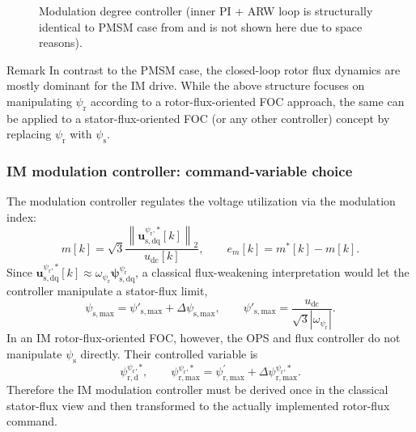 \begin{frame}
\begin{figure}
\begin{circuitikz}[>=Latex, scale=0.75, transform shape]
        \end{circuitikz}%
        \caption{Modulation degree controller  (inner PI + ARW loop is structurally identical to PMSM case from  and is not shown here due to space reasons).}
        \label{fig:modulation_degree_control_IM}
    \end{figure}\pause%
    \vspace{-0.65cm}
    \begin{varblock}{Remark}
        In contrast to the PMSM case, the closed-loop rotor flux dynamics are mostly dominant for the IM drive. While the above structure focuses on manipulating $\psi_\mathrm{r}$ according to a rotor-flux-oriented FOC approach, the same can be applied to a stator-flux-oriented FOC (or any other controller) concept by replacing $\psi_\mathrm{r}$ with $\psi_\mathrm{s}$.
    \end{varblock}
\end{frame}

\begin{frame}
    \frametitle{IM modulation controller: command-variable choice}
    The modulation controller regulates the voltage utilization via the modulation index:
    \begin{equation}
        m[k]=\sqrt{3}\frac{\left\|\bm{u}^{\psi_{\mathrm r},*}_{\mathrm{s,dq}}[k]\right\|_2}{u_{\mathrm{dc}}[k]},
        \qquad e_m[k]=m^*[k]-m[k].
        \label{eq:IM_mod_v06_m_definition}
    \end{equation}\pause%
    Since $\bm{u}^{\psi_{\mathrm r},*}_{\mathrm{s,dq}}[k]\approx \omega_{\psi_{\mathrm r}}\bm{\psi}_{\mathrm{s,dq}}^{\psi_{\mathrm r}}$, a classical flux-weakening interpretation would let the controller manipulate a stator-flux limit,
    \begin{equation}
        \psi_{\mathrm{s,max}}=\psi'_{\mathrm{s,max}}+\Delta\psi_{\mathrm{s,max}},
        \qquad
        \psi'_{\mathrm{s,max}}=\frac{u_{\mathrm{dc}}}{\sqrt{3}|\omega_{\psi_{\mathrm r}}|} .
        \label{eq:IM_mod_v06_classical_stator_limit}
    \end{equation}\pause%
    In an IM rotor-flux-oriented FOC, however, the OPS and flux controller do not manipulate $\psi_{\mathrm{s}}$ directly. \pause  Their controlled variable is
    \begin{equation}
        \psi_{\mathrm{r,d}}^{\psi_{\mathrm r},*},
        \qquad
        \psi_{\mathrm{r,max}}^{\psi_{\mathrm r},*}=\psi_{\mathrm{r,max}}^{\prime}+\Delta\psi_{\mathrm{r,max}}^{\psi_{\mathrm r},*} .
        \label{eq:IM_mod_v06_actual_rotor_limit}
    \end{equation}\pause%
    Therefore the IM modulation controller must be derived once in the classical stator-flux view and then transformed to the actually implemented rotor-flux command.
\end{frame}

